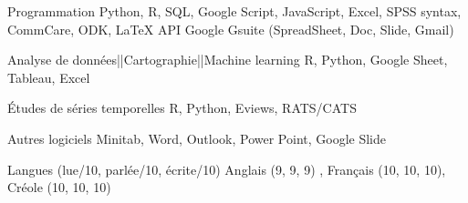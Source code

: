 


\begin{cvskills}


\cvskill
{Programmation} %
{Python, R, SQL, Google Script, JavaScript, Excel, SPSS syntax, CommCare, ODK, \LaTeX } %
\cvskill
{API} %
{Google Gsuite (SpreadSheet, Doc, Slide, Gmail)} %


\cvskill
{Analyse de données||Cartographie||Machine learning} %
{R, Python, Google Sheet, Tableau, Excel} %




\cvskill
{\'Etudes de séries temporelles} %
{R, Python, Eviews, RATS/CATS} %


\cvskill
{Autres logiciels} %
{Minitab, Word, Outlook, Power Point, Google Slide} %


\cvskill
{Langues (lue/10, parlée/10, écrite/10)} %
{Anglais (9, 9, 9) , Français (10, 10, 10), Créole (10, 10, 10)} %



\end{cvskills}